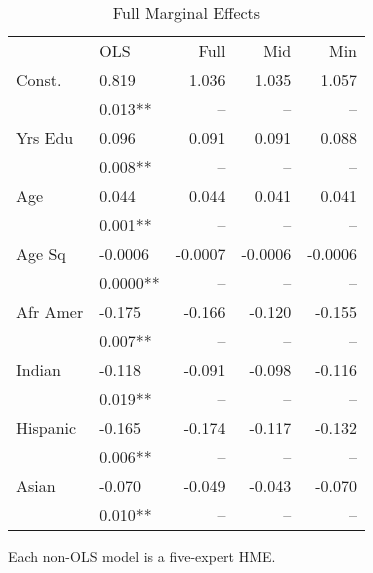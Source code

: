 \documentclass[12pt]{article}
\begin{document}
\begin{table} \centering
  \caption{Full Marginal Effects}
  \begin{threeparttable}
    \begin{tabular}[l]{l l r r r}
      \cmidrule{1-5}

                  & OLS      & Full    & Mid     & Min    \\
      \cmidrule{1-5}

      Const.      & 0.819    &  1.036  & 1.035   & 1.057  \\
                  & 0.013**  &  --     & --      & --     \\[0.3cm]
      
      Yrs Edu     & 0.096    & 0.091   & 0.091   & 0.088  \\
                  & 0.008**  & --      & --      & --     \\[0.3cm]

      Age         & 0.044    & 0.044   & 0.041   & 0.041  \\
                  & 0.001**  & --      & --      & --     \\[0.3cm]

      Age Sq      & -0.0006  & -0.0007 & -0.0006 & -0.0006\\
                  & 0.0000** & --      & --      & --     \\[0.3cm]

      Afr Amer    & -0.175   & -0.166  & -0.120  & -0.155 \\
                  & 0.007**  & --      & --      & --     \\[0.3cm]

      Indian      & -0.118   & -0.091  & -0.098  & -0.116 \\
                  & 0.019**  & --      & --      & --     \\[0.3cm]

      Hispanic    & -0.165   & -0.174  & -0.117  & -0.132 \\
                  & 0.006**  & --      & --      & --     \\[0.3cm]

      Asian       & -0.070   & -0.049  & -0.043  & -0.070 \\
                  & 0.010**  & --      & --      & --     \\[0.3cm]


      \hline
    \end{tabular}
    \begin{tablenotes}
      \item[1]{\footnotesize Each non-OLS model is a five-expert HME.}
    \end{tablenotes} \label{tbl:model_marg_effects}
  \end{threeparttable}
\end{table}
\end{document}
